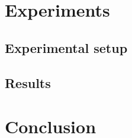 \documentclass{ecai2010}
\begin{document}
\section{Experiments}
\subsection{Experimental setup}

\subsection{Results}

\section{Conclusion}


\end{document}

